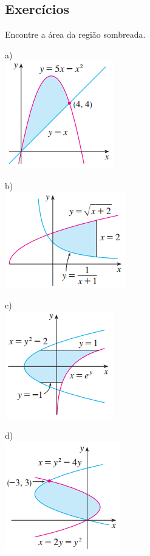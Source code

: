 \cleardoublepage\documentclass[../main.tex]{subfiles}
\begin{document}
\subsection{Exercícios}
\begin{exer}
Encontre a área da região sombreada.
\begin{multicols}{2}
\begin{description}
\item a) \\\includegraphics[scale=1.2]{figs/AreaEntcurvas/Area1Exer.png}\hfill 
 \item b)\\  \includegraphics[scale=1.2]{figs/AreaEntcurvas/Area2Exer.png}
 \end{description}
\end{multicols}
\begin{multicols}{2}
\begin{description}
\item c)\\  \includegraphics[scale=1.2]{figs/AreaEntcurvas/Area3Exer.png}
\item d)\\  \includegraphics[scale=1.2]{figs/AreaEntcurvas/Area4Exer.png}
\end{description}
\end{multicols}
\end{exer}
\end{document}
